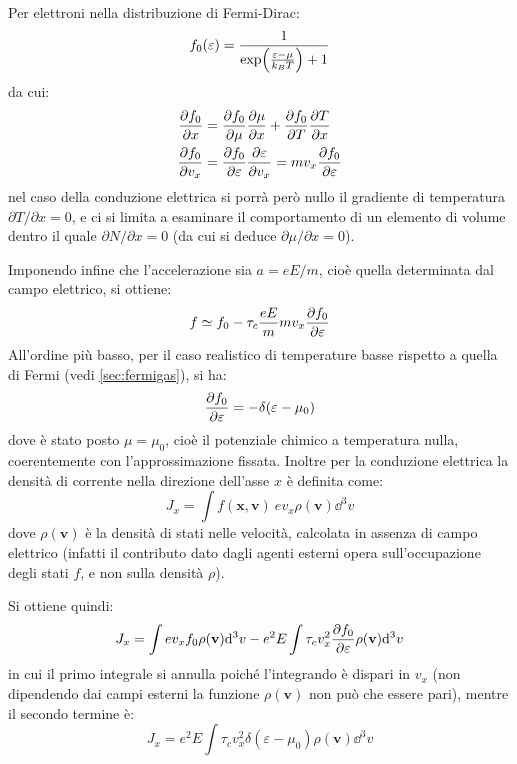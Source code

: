 Per elettroni nella distribuzione di Fermi-Dirac:
\begin{equation*}
f_0 (\varepsilon) = \frac{1}{\exp(\frac{\varepsilon - \mu}{k_B T}) + 1}
\end{equation*}
da cui:
\begin{align*}
\frac{\partial {f_0}}{\partial {x}} &= \frac{\partial {f_0}}{\partial {\mu}} \frac{\partial {\mu}}{\partial {x}} + \frac{\partial {f_0}}{\partial {T}} \frac{\partial {T}}{\partial {x}}\\
\frac{\partial {f_0}}{\partial {v_x}} &= \frac{\partial {f_0}}{\partial {\varepsilon}} \frac{\partial {\varepsilon}}{\partial {v_x}} = m v_x \frac{\partial {f_0}}{\partial {\varepsilon}}
\end{align*}
nel caso della conduzione elettrica si porrà però nullo il gradiente di temperatura $ \partial T / \partial x = 0 $, e ci si limita a esaminare il comportamento di un elemento di volume dentro il quale $ \partial N / \partial x = 0 $ (da cui si deduce $ \partial \mu / \partial x = 0$).

Imponendo infine che l'accelerazione sia $ a = e E / m $, cioè quella determinata dal campo elettrico, si ottiene:
\begin{equation*}
f \simeq f_0 - \tau_c \frac{e E}{m} m v_x \frac{\partial {f_0}}{\partial {\varepsilon}}
\end{equation*}
All'ordine più basso, per il caso realistico di temperature basse rispetto a quella di Fermi (vedi \cref{sec:fermigas}), si ha:
\begin{equation*}
\frac{\partial {f_0}}{\partial {\varepsilon}} = - \delta (\varepsilon - \mu_0)
\end{equation*}
dove è stato posto $ \mu = \mu_0  $, cioè il potenziale chimico a temperatura nulla, coerentemente con l'approssimazione fissata.
Inoltre per la conduzione elettrica la densità di corrente nella direzione dell'asse $ x $ è definita come:
\begin{equation*}
J_x = \int f(\textbf{x},\textbf{v})~ e v_x \rho(\textbf{v}) \dd^3 v
\end{equation*}
dove $ \rho(\textbf{v}) $ è la densità di stati nelle velocità, calcolata in assenza di campo elettrico (infatti il contributo dato dagli agenti esterni opera sull'occupazione degli stati $ f $, e non sulla densità $ \rho $).

Si ottiene quindi:
\begin{equation*}
J_x = \int e v_x f_0 \rho(\textbf{v}) \dd^3 v - e^2 E \int \tau_c v_x ^2 \frac{\partial {f_0}}{\partial {\varepsilon}} \rho(\textbf{v}) \dd^3 v
\end{equation*}
in cui il primo integrale si annulla poiché l'integrando è dispari in $ v_x $ (non dipendendo dai campi esterni la funzione $ \rho(\textbf{v}) $ non può che essere pari), mentre il secondo termine è:
\begin{equation*}
J_x = e^2 E \int \tau_c  v_x ^2 \delta (\varepsilon - \mu_0) \rho(\textbf{v}) \dd^3 v
\end{equation*}

